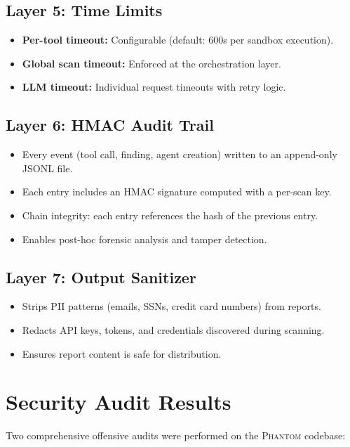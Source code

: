 \documentclass[12pt,a4paper,twoside]{report}
\makeatletter
\newcommand{\phantom@}{\textsc{Phantom}}
\makeatother
\begin{document}
\subsection{Layer 5: Time Limits}

\begin{itemize}
    \item \textbf{Per-tool timeout:} Configurable (default: 600s per sandbox execution).
    \item \textbf{Global scan timeout:} Enforced at the orchestration layer.
    \item \textbf{LLM timeout:} Individual request timeouts with retry logic.
\end{itemize}

\subsection{Layer 6: HMAC Audit Trail}

\begin{itemize}
    \item Every event (tool call, finding, agent creation) written to an append-only JSONL file.
    \item Each entry includes an HMAC signature computed with a per-scan key.
    \item Chain integrity: each entry references the hash of the previous entry.
    \item Enables post-hoc forensic analysis and tamper detection.
\end{itemize}

\subsection{Layer 7: Output Sanitizer}

\begin{itemize}
    \item Strips PII patterns (emails, SSNs, credit card numbers) from reports.
    \item Redacts API keys, tokens, and credentials discovered during scanning.
    \item Ensures report content is safe for distribution.
\end{itemize}

\section{Security Audit Results}

Two comprehensive offensive audits were performed on the \phantom@{} codebase:
\end{document}
